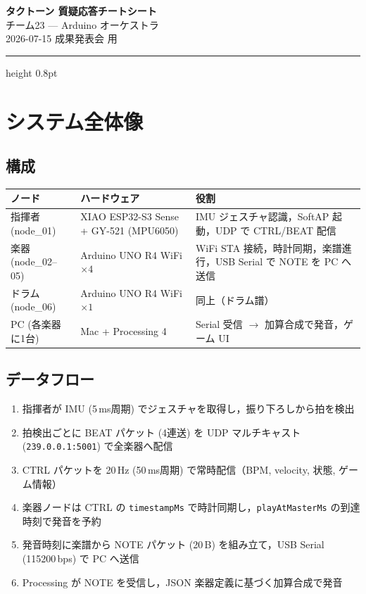 \documentclass[uplatex,dvipdfmx,a4paper,10pt]{jsarticle}
\begin{document}
\begin{center}
  {\LARGE\bfseries タクトーン 質疑応答チートシート}\\[6pt]
  {\large チーム23 — Arduino オーケストラ}\\[3pt]
  {\normalsize 2026-07-15 成果発表会 用}
\end{center}
\vspace{-6pt}
\hrule height 0.8pt
\vspace{8pt}

\section{システム全体像}

\subsection{構成}

\begin{tabularx}{\textwidth}{llX}
\toprule
ノード & ハードウェア & 役割 \\
\midrule
指揮者 (node\_01) & XIAO ESP32-S3 Sense + GY-521 (MPU6050) & IMU ジェスチャ認識，SoftAP 起動，UDP で CTRL/BEAT 配信 \\
楽器 (node\_02--05) & Arduino UNO R4 WiFi $\times 4$ & WiFi STA 接続，時計同期，楽譜進行，USB Serial で NOTE を PC へ送信 \\
ドラム (node\_06) & Arduino UNO R4 WiFi $\times 1$ & 同上（ドラム譜） \\
PC (各楽器に1台) & Mac + Processing 4 & Serial 受信 $\to$ 加算合成で発音，ゲーム UI \\
\bottomrule
\end{tabularx}

\subsection{データフロー}

\begin{enumerate}
  \item 指揮者が IMU (5\,ms周期) でジェスチャを取得し，振り下ろしから拍を検出
  \item 拍検出ごとに BEAT パケット (4連送) を UDP マルチキャスト (\texttt{239.0.0.1:5001}) で全楽器へ配信
  \item CTRL パケットを 20\,Hz (50\,ms周期) で常時配信（BPM, velocity, 状態, ゲーム情報）
  \item 楽器ノードは CTRL の \texttt{timestampMs} で時計同期し，\texttt{playAtMasterMs} の到達時刻で発音を予約
  \item 発音時刻に楽譜から NOTE パケット (20\,B) を組み立て，USB Serial (115200\,bps) で PC へ送信
  \item Processing が NOTE を受信し，JSON 楽器定義に基づく加算合成で発音
\end{enumerate}
\end{document}
